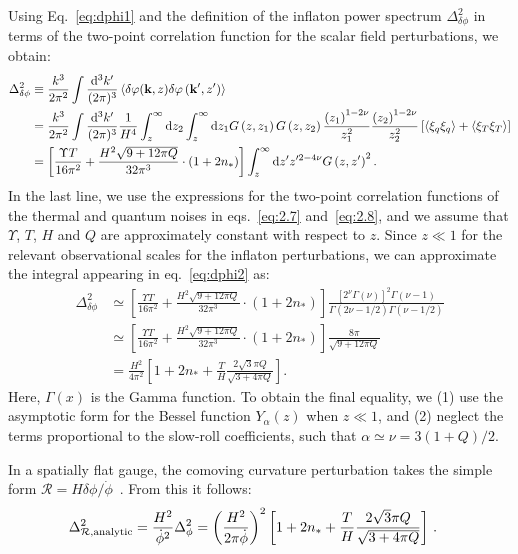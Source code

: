 \documentclass[a4paper,11pt]{article}
\begin{document}
Using Eq.~\eqref{eq:dphi1} and the definition of the inflaton power spectrum $\Delta^2_{\delta\phi}$ in terms of the two-point correlation function for the scalar field perturbations, we obtain:
\begin{align}
    \Delta^2_{\delta\phi}&\equiv \frac{k^3}{2 \pi^2} \int \frac{{\rm d}^3 k^{\prime}}{(2 \pi)^3}\left\langle\delta \varphi(\mathbf{k}, z) \delta \varphi\left(\mathbf{k}^{\prime}, z^\prime\right)\right\rangle \\
    &=\frac{k^3}{2 \pi^2} \int \frac{{\rm d}^3 k^{\prime}}{(2 \pi)^3} \frac{1}{H^4} \int_z^{\infty} {\rm d} z_2 \int_z^{\infty} {\rm d} z_1 G\left(z, z_1\right) G\left(z, z_2\right) \frac{\left(z_1\right)^{1-2 \nu}}{z_1^2} \frac{\left(z_2\right)^{1-2 \nu}}{z_2^2}\left[\left\langle\xi_q \xi_q\right\rangle +\left\langle\xi_T\xi_T\right\rangle \right] \nonumber \\
    &=\left[\frac{\Upsilon T}{16\pi^2}+\frac{H^2\sqrt{9+12\pi Q}}{ 32\pi^3}\cdot(1+2n_{*}) \right]\int_z^{\infty} {\rm d} z^{\prime} z^{\prime 2-4 \nu} G\left(z, z^{\prime}\right)^2. \label{eq:dphi2}
\end{align}
In the last line, we use the expressions for the two-point correlation functions of the thermal and quantum noises in eqs.~\eqref{eq:2.7} and~\eqref{eq:2.8}, and we assume that $\Upsilon$, $T$, $H$ and $Q$ are approximately constant with respect to $z$. Since $z\ll 1$ for the relevant observational scales for the inflaton perturbations, we can approximate the integral
appearing in eq.~\eqref{eq:dphi2} as:
\begin{align}
     \Delta^2_{\delta\phi}&\simeq\left[\frac{\Upsilon T}{16\pi^2}+\frac{H^2\sqrt{9+12\pi Q}}{ 32\pi^3}\cdot(1+2n_{\mathrm{*}}) \right] \frac{\left[2^\nu \Gamma(\nu)\right]^2 \Gamma(\nu-1)}{\Gamma(2 \nu-1 / 2) \Gamma(\nu-1 / 2)} \label{eq:gamma_expression} \\
 &\simeq \left[\frac{\Upsilon T}{16\pi^2}+\frac{H^2\sqrt{9+12\pi Q}}{ 32\pi^3}\cdot(1+2n_{\mathrm{*}}) \right]\frac{8\pi}{\sqrt{9+12\pi Q}} \\
 &=\frac{H^2}{4\pi^2}\left[1+2n_{\mathrm{*}}+\frac{T}{H}\frac{2\sqrt{3}\pi Q}{\sqrt{3+4\pi Q}} \right].
\end{align}
Here, $\Gamma(x)$ is the Gamma function. To obtain the final equality, we (1) use the asymptotic form for the Bessel function $Y_\alpha(z)$ when $z\ll 1$, and (2) neglect the terms proportional to the slow-roll coefficients, such that $\alpha\simeq \nu =3(1+Q)/2$.  

In a spatially flat gauge, the comoving curvature perturbation takes the simple form $\mathcal{R}= H\delta\phi/\dot{\phi}$~\cite{liddle_lyth_2000}. From this it follows:
\begin{align}
\Delta_{\mathcal{R},\rm{analytic}}^2&=\frac{H^2}{\dot{\phi}^2}\Delta_{\phi}^2=\left(\frac{H^2}{2\pi \dot{\phi}}\right)^2\left[1+2n_{\mathrm{*}}+\frac{T}{H}\frac{2\sqrt{3}\pi Q}{\sqrt{3+4\pi Q}} \right]\,.
    \label{eq:DeltaR_analytic}
\end{align}
\end{document}
